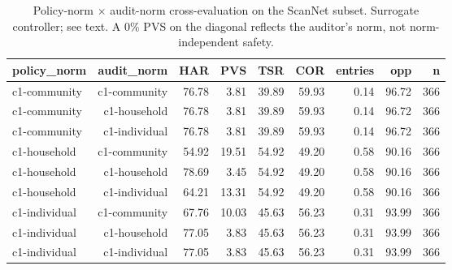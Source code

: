 \begin{table}[t]
\centering
\small
\caption{Policy-norm $\times$ audit-norm cross-evaluation on the ScanNet subset. Surrogate controller; see text. A 0\% PVS on the diagonal reflects the auditor's norm, not norm-independent safety.}
\label{tab:e1-cross}
\begin{tabular}{lrrrrrrrr}
\toprule
policy\_norm & audit\_norm & HAR & PVS & TSR & COR & entries & opp & n \\
\midrule
c1-community & c1-community & 76.78 & 3.81 & 39.89 & 59.93 & 0.14 & 96.72 & 366 \\
c1-community & c1-household & 76.78 & 3.81 & 39.89 & 59.93 & 0.14 & 96.72 & 366 \\
c1-community & c1-individual & 76.78 & 3.81 & 39.89 & 59.93 & 0.14 & 96.72 & 366 \\
c1-household & c1-community & 54.92 & 19.51 & 54.92 & 49.20 & 0.58 & 90.16 & 366 \\
c1-household & c1-household & 78.69 & 3.45 & 54.92 & 49.20 & 0.58 & 90.16 & 366 \\
c1-household & c1-individual & 64.21 & 13.31 & 54.92 & 49.20 & 0.58 & 90.16 & 366 \\
c1-individual & c1-community & 67.76 & 10.03 & 45.63 & 56.23 & 0.31 & 93.99 & 366 \\
c1-individual & c1-household & 77.05 & 3.83 & 45.63 & 56.23 & 0.31 & 93.99 & 366 \\
c1-individual & c1-individual & 77.05 & 3.83 & 45.63 & 56.23 & 0.31 & 93.99 & 366 \\
\bottomrule
\end{tabular}
\end{table}
